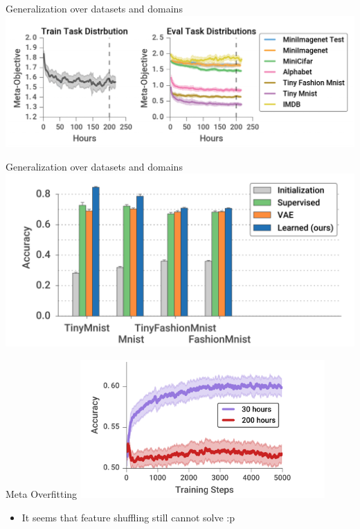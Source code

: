 \documentclass{beamer}
\begin{document}
\begin{frame}{Generalization over datasets and domains}
  \center \includegraphics[width=\textwidth]{fig/lc.png}
\end{frame}

\begin{frame}{Generalization over datasets and domains}
  \center \includegraphics[width=\textwidth]{fig/mnist.png}
\end{frame}

\begin{frame}{Meta Overfitting}
  \center \includegraphics[width=0.7\textwidth]{fig/meta-overfitting.png}
  \begin{itemize}
    \item It seems that feature shuffling still cannot solve :p
  \end{itemize}
\end{frame}
\end{document}
